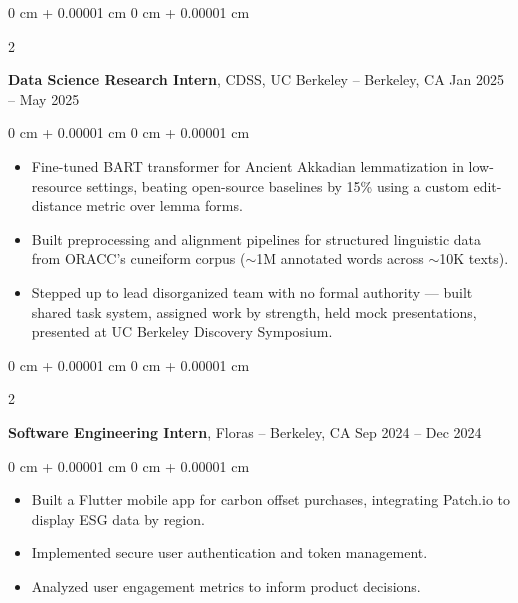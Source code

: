 \documentclass[10pt, letterpaper]{article}
\newenvironment{highlights}{
    \begin{itemize}[
        topsep=0.3 cm,
        parsep=0.05 cm,
        partopsep=0pt,
        itemsep=0pt,
        leftmargin=0 cm + 10pt
    ]
}{
    \end{itemize}
} %
\newenvironment{onecolentry}{
    \begin{adjustwidth}{
        0 cm + 0.00001 cm
    }{
        0 cm + 0.00001 cm
    }
}{
    \end{adjustwidth}
} %
\newenvironment{twocolentry}[2][]{
    \onecolentry
    \def\secondColumn{#2}
    \setcolumnwidth{\fill, 4.5 cm}
    \begin{paracol}{2}
}{
    \switchcolumn \raggedleft \secondColumn
    \end{paracol}
    \endonecolentry
} %
\begin{document}
        \vspace{0.07 cm}

        \begin{twocolentry}{
            Jan 2025 – May 2025
        }
            \textbf{Data Science Research Intern}, CDSS, UC Berkeley -- Berkeley, CA\end{twocolentry}

        \vspace{0.07 cm}
        \begin{onecolentry}
            \begin{highlights}
                \item Fine-tuned BART transformer for Ancient Akkadian lemmatization in low-resource settings, beating open-source baselines by 15\% using a custom edit-distance metric over lemma forms.
                \item Built preprocessing and alignment pipelines for structured linguistic data from ORACC's cuneiform corpus ($\sim$1M annotated words across $\sim$10K texts).
                \item Stepped up to lead disorganized team with no formal authority — built shared task system, assigned work by strength, held mock presentations, presented at UC Berkeley Discovery Symposium.
            \end{highlights}
       \end{onecolentry}

        \vspace{0.07 cm}

        \begin{twocolentry}{
            Sep 2024 – Dec 2024
        }
            \textbf{Software Engineering Intern}, Floras -- Berkeley, CA\end{twocolentry}

        \vspace{0.07 cm}
        \begin{onecolentry}
            \begin{highlights}
                \item Built a Flutter mobile app for carbon offset purchases, integrating Patch.io to display ESG data by region.
                \item Implemented secure user authentication and token management.
                \item Analyzed user engagement metrics to inform product decisions.
            \end{highlights}
        \end{onecolentry}
\end{document}
